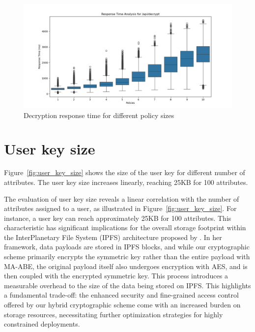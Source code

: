 \documentclass[cic,tc,english]{iiufrgs}
\begin{document}
            \begin{figure}
                \centering
                \includegraphics[width=\textwidth]{images/phase4/response_time_api_decrypt.png}
                \caption{Decryption response time for different policy sizes}
                \label{fig:decrypt_policy_size}
            \end{figure}

        
        \section{User key size}
            \label{sec:keysize}
            Figure~\ref{fig:user_key_size} shows the size of the user key for different number of attributes. The user key size increases linearly, reaching 25KB for 100 attributes.

            The evaluation of user key size reveals a linear correlation with the number of attributes assigned to a user, as illustrated in Figure~\ref{fig:user_key_size}. For instance, a user key can reach approximately 25KB for 100 attributes. This characteristic has significant implications for the overall storage footprint within the InterPlanetary File System (IPFS) architecture proposed by \citet{laura2023}. In her framework, data payloads are stored in IPFS blocks, and while our cryptographic scheme primarily encrypts the symmetric key rather than the entire payload with MA-ABE, the original payload itself also undergoes encryption with AES, and is then coupled with the encrypted symmetric key. This process introduces a measurable overhead to the size of the data being stored on IPFS. This highlights a fundamental trade-off: the enhanced security and fine-grained access control offered by our hybrid cryptographic scheme come with an increased burden on storage resources, necessitating further optimization strategies for highly constrained deployments.
\end{document}
